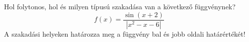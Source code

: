 \documentclass[11pt]{scrartcl}
\begin{document}
Hol folytonos, hol és milyen típusú szakadása van a következő függvénynek?
\[
	f(x) = \frac{\sin(x + 2)}{\left| x^2 - x - 6 \right|}
\]
A szakadási helyeken határozza meg a függvény bal és jobb oldali
határértékét!
\end{document}

